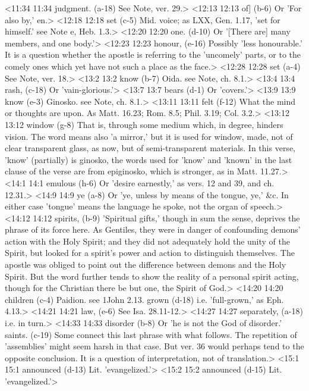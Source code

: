 <11:34 11:34  judgment. (a-18)  See Note, ver. 29.>
<12:13 12:13  of] (b-6)  Or 'For also by,' en.>
<12:18 12:18  set (c-5)  Mid. voice; as LXX, Gen. 1.17, 'set for himself.' see Note e,  Heb. 1.3.>
<12:20 12:20  one. (d-10)  Or '[There are] many members, and one body.'>
<12:23 12:23  honour, (e-16)  Possibly 'less honourable.' It is a question whether the  apostle is referring to the 'uncomely' parts, or to the comely  ones which yet have not such a place as the face.>
<12:28 12:28  set (a-4)  See Note, ver. 18.>
<13:2 13:2  know (b-7)  Oida. see Note, ch. 8.1.>
<13:4 13:4  rash, (c-18)  Or 'vain-glorious.'>
<13:7 13:7  bears (d-1)  Or 'covers.'>
<13:9 13:9  know (e-3)  Ginosko. see Note, ch. 8.1.>
<13:11 13:11  felt (f-12)  What the mind or thoughts are upon. As Matt. 16.23; Rom. 8.5;  Phil. 3.19; Col. 3.2.>
<13:12 13:12  window (g-8)  That is, through some medium which, in degree, hinders  vision. The word means also 'a mirror,' but it is used for  window, made, not of clear transparent glass, as now, but of  semi-transparent materials. In this verse, 'know' (partially)  is ginosko, the words used for 'know' and 'known' in the last  clause of the verse are from epiginosko, which is stronger,  as in Matt. 11.27.>
<14:1 14:1  emulous (h-6)  Or 'desire earnestly,' as vers. 12 and 39, and ch. 12.31.>
<14:9 14:9  ye (a-8)  Or 'ye, unless by means of the tongue, ye,' &c. In either  case 'tongue' means the language he spoke, not the organ of  speech.>
<14:12 14:12  spirits, (b-9)  'Spiritual gifts,' though in sum the sense, deprives the  phrase of its force here. As Gentiles, they were in danger of  confounding demons' action with the Holy Spirit; and they did  not adequately hold the unity of the Spirit, but looked for a  spirit's power and action to distinguish themselves. The  apostle was obliged to point out the difference between demons  and the Holy Spirit. But the word further tends to show the  reality of a personal spirit acting, though for the Christian  there be but one, the Spirit of God.>
<14:20 14:20  children (c-4)  Paidion. see 1John 2.13.
  grown (d-18)  i.e. 'full-grown,' as Eph. 4.13.>
<14:21 14:21  law, (e-6)  See Isa. 28.11-12.>
<14:27 14:27  separately, (a-18)  i.e. in turn.>
<14:33 14:33  disorder (b-8)  Or 'he is not the God of disorder.'
  saints. (c-19)  Some connect this last phrase with what follows. The  repetition of 'assemblies' might seem harsh in that case. But  ver. 36 would perhaps tend to the opposite conclusion. It is a  question of interpretation, not of translation.>
<15:1 15:1  announced (d-13)  Lit. 'evangelized.'>
<15:2 15:2  announced (d-15)  Lit. 'evangelized.'>
